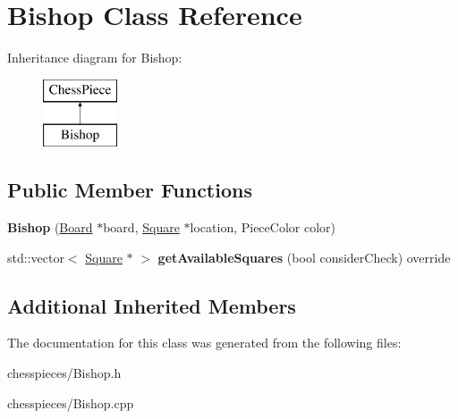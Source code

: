 \hypertarget{class_bishop}{}\section{Bishop Class Reference}
\label{class_bishop}
Inheritance diagram for Bishop\+:\begin{figure}[H]
\begin{center}
\leavevmode
\includegraphics[height=2.000000cm]{class_bishop}
\end{center}
\end{figure}
\subsection*{Public Member Functions}
\begin{DoxyCompactItemize}
\item 
\mbox{\label{class_bishop_a06f0625981bd2448de46b99edb4afb00}} 
{\bfseries Bishop} (\mbox{\hyperlink{class_board}{Board}} $\ast$board, \mbox{\hyperlink{class_square}{Square}} $\ast$location, Piece\+Color color)
\item 
\mbox{\label{class_bishop_a2239bc73616d1545289e55f3ee6b686d}} 
std\+::vector$<$ \mbox{\hyperlink{class_square}{Square}} $\ast$ $>$ {\bfseries get\+Available\+Squares} (bool consider\+Check) override
\end{DoxyCompactItemize}
\subsection*{Additional Inherited Members}


The documentation for this class was generated from the following files\+:\begin{DoxyCompactItemize}
\item 
chesspieces/Bishop.\+h\item 
chesspieces/Bishop.\+cpp\end{DoxyCompactItemize}
